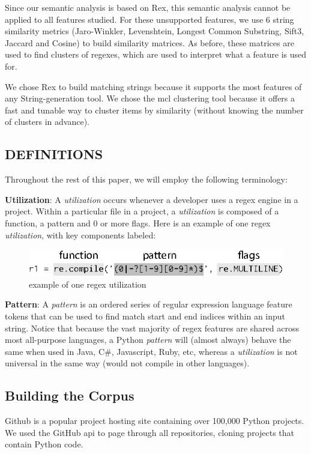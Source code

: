Since our semantic analysis is based on Rex, this semantic analysis cannot be applied to all features studied.  For these unsupported features, we use 6 string similarity metrics (Jaro-Winkler, Levenshtein, Longest Common Substring, Sift3, Jaccard and Cosine) to build similarity matrices.  As before, these matrices are used to find clusters of regexes, which are used to interpret what a feature is used for.

We chose Rex to build matching strings because it supports the most features of any String-generation tool.  We chose the mcl clustering tool because it offers a fast and tunable way to cluster items by similarity (without knowing the number of clusters in advance).

\subsection{{DEFINITIONS}}
Throughout the rest of this paper, we will employ the following terminology:

\noindent \textbf{Utilization}: A \emph{utilization} occurs whenever a developer uses a regex engine in a project.  Within a particular file in a project, a \emph{utilization} is composed of a function, a pattern and 0 or more flags.  Here is an example of one regex \emph{utilization}, with key components labeled:

\begin{figure}[htb]
\centering
\includegraphics[width=\columnwidth]{../illustrations/exampleUsage.eps}
\caption{example of one regex utilization}
\label{fig:exampleUsage}
\end{figure}

\noindent \textbf{Pattern}: A \emph{pattern} is an ordered series of regular expression language feature tokens that can be used to find match start and end indices within an input string.  Notice that because the vast majority of regex features are shared across most all-purpose languages, a Python \emph{pattern} will (almost always) behave the same when used in Java, C\#, Javascript, Ruby, etc, whereas a \emph{utilization} is not universal in the same way (would not compile in other languages).

\subsection{Building the Corpus}
\label{study:corpus}
Github is a popular project hosting site containing over 100,000 Python projects.
We used the GitHub api to page through all repositories, cloning projects that contain Python code.

